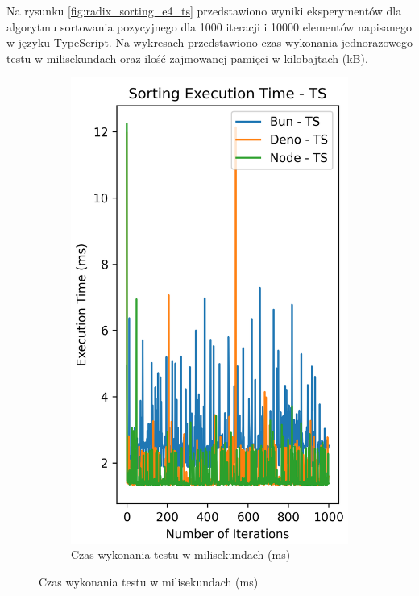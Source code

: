 Na rysunku \ref{fig:radix_sorting_e4_ts} przedstawiono wyniki eksperymentów dla algorytmu sortowania pozycyjnego dla 1000 iteracji i 10000 elementów napisanego w języku TypeScript. Na wykresach przedstawiono czas wykonania jednorazowego testu w milisekundach oraz ilość zajmowanej pamięci w kilobajtach (kB).

\begin{figure}[H]
  \centering
  \begin{subfigure}[b]{0.44\textwidth}
    \centering
    \includegraphics[width=\textwidth]{Figures/sorting/sorting_radix_1000_10000_ts_time.png}
    \caption{Czas wykonania testu w milisekundach (ms)}

\end{subfigure}
\end{figure}
